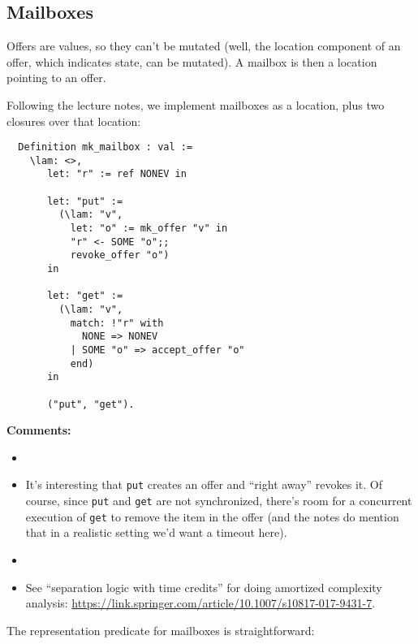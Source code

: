 \subsection{Mailboxes}

Offers are values, so they can't be mutated (well, the location component of an offer, which indicates state, can be mutated).  A mailbox is then a location pointing to an offer.

Following the lecture notes, we implement mailboxes as a location, plus two closures over that location:

\begin{verbatim}
  Definition mk_mailbox : val :=
    \lam: <>,
       let: "r" := ref NONEV in

       let: "put" :=
         (\lam: "v",
           let: "o" := mk_offer "v" in
           "r" <- SOME "o";;
           revoke_offer "o")
       in

       let: "get" :=
         (\lam: "v",
           match: !"r" with
             NONE => NONEV
           | SOME "o" => accept_offer "o"
           end)
       in
        
       ("put", "get").
\end{verbatim}

\textbf{Comments:}
\begin{itemize}
\item {}

\item It's interesting that \texttt{put} creates an offer and ``right away'' revokes it. Of course, since \texttt{put} and \texttt{get} are not synchronized, there's room for a concurrent execution of \texttt{get} to remove the item in the offer (and the notes do mention that in a realistic setting we'd want a timeout here).

\item {}

\item See ``separation logic with time credits'' for doing amortized complexity analysis: \url{https://link.springer.com/article/10.1007/s10817-017-9431-7}.
\end{itemize}

The representation predicate for mailboxes is straightforward:

